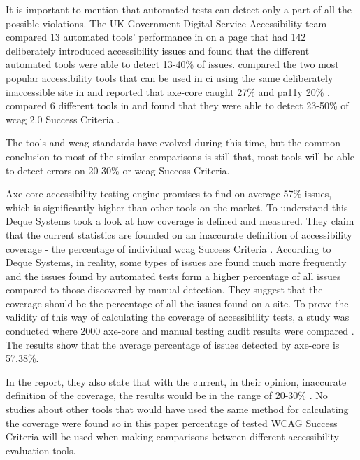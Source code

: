 \documentclass{master_thesis}
\begin{document}
It is important to mention that automated tests can detect only a part of all the possible violations. The UK Government Digital Service Accessibility team compared 13 automated tools' performance in \citeyear{GAT2018} on a page that had 142 deliberately introduced accessibility issues and found that the different automated tools were able to detect 13-40\% of issues. \citeauthor{Abbott2021} compared the two most popular accessibility tools that can be used in \ac{ci} using the same deliberately inaccessible site in \citeyear{Abbott2021} and reported that axe-core caught 27\% and pa11y 20\% \citep{Abbott2021}. \citeauthor{Vigo2013} compared 6 different tools in \citeyear{Vigo2013} and found that they were able to detect 23-50\% of  \ac{wcag} 2.0 Success Criteria \citep{GAT2018, Abbott2021, Vigo2013}.

The tools and \ac{wcag} standards have evolved during this time, but the common conclusion to most of the similar comparisons is still that, most tools will be able to detect errors on 20-30\% or \ac{wcag} Success Criteria.

Axe-core accessibility testing engine promises to find on average 57\% issues, which is significantly higher than other tools on the market. To understand this Deque Systems took a look at how coverage is defined and measured. They claim that the current statistics are founded on an inaccurate definition of accessibility coverage - the percentage of individual \ac{wcag} Success Criteria \citep{Deque2023}. According to Deque Systems, in reality, some types of issues are found much more frequently and the issues found by automated tests form a higher percentage of all issues compared to those discovered by manual detection. They suggest that the coverage should be the percentage of all the issues found on a site. To prove the validity of this way of calculating the coverage of accessibility tests, a study was conducted where 2000 axe-core and manual testing audit results were compared \citep{DequeSystems2021report}. The results show that the average percentage of issues detected by axe-core is 57.38\%.

In the report, they also state that with the current, in their opinion, inaccurate definition of the coverage, the results would be in the range of 20-30\% \citep{DequeSystems2021report}. No studies about other tools that would have used the same method for calculating the coverage were found so in this paper percentage of tested WCAG Success Criteria will be used when making comparisons between different accessibility evaluation tools.
\end{document}
